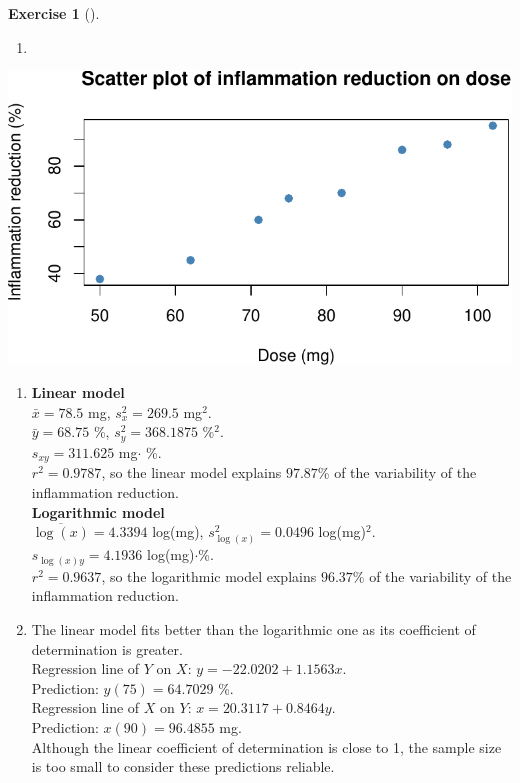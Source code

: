 \documentclass[
  a4paper,
]{scrreport}
\providecommand{\tightlist}{%
  \setlength{\itemsep}{0pt}\setlength{\parskip}{0pt}}\usepackage{longtable,booktabs,array}
\theoremstyle{definition}
\newtheorem{exercise}{Exercise}[chapter]
\theoremstyle{remark}
\begin{document}
\begin{exercise}[]
\begin{tcolorbox}
\begin{enumerate}
\def\labelenumi{\alph{enumi}.}
\tightlist
\item
\end{enumerate}

\includegraphics{exam-2023-05-30-des_files/figure-pdf/scatter plot-1.pdf}

\begin{enumerate}
\def\labelenumi{\alph{enumi}.}
\item
  \textbf{Linear model}\\
  \(\bar x=78.5\) mg, \(s_x^2=269.5\) mg\(^2\).\\
  \(\bar y=68.75\) \%, \(s_y^2=368.1875\) \%\(^2\).\\
  \(s_{xy}=311.625\) mg\(\cdot\) \%.\\
  \(r^2=0.9787\), so the linear model explains \(97.87\)\% of the
  variability of the inflammation reduction.\\
  \textbf{Logarithmic model}\\
  \(\overline{\log(x)}=4.3394\) log(mg), \(s_{\log(x)}^2=0.0496\)
  log(mg)\(^2\).\\
  \(s_{\log(x)y}=4.1936\) log(mg)\(\cdot\)\%.\\
  \(r^2=0.9637\), so the logarithmic model explains \(96.37\)\% of the
  variability of the inflammation reduction.
\item
  The linear model fits better than the logarithmic one as its
  coefficient of determination is greater.\\
  Regression line of \(Y\) on \(X\): \(y=-22.0202+1.1563x\).\\
  Prediction: \(y(75)=64.7029\) \%.\\
  Regression line of \(X\) on \(Y\): \(x=20.3117+0.8464y\).\\
  Prediction: \(x(90)=96.4855\) mg.\\
  Although the linear coefficient of determination is close to 1, the
  sample size is too small to consider these predictions reliable.
\end{enumerate}

\end{tcolorbox}

\end{exercise}
\end{document}
